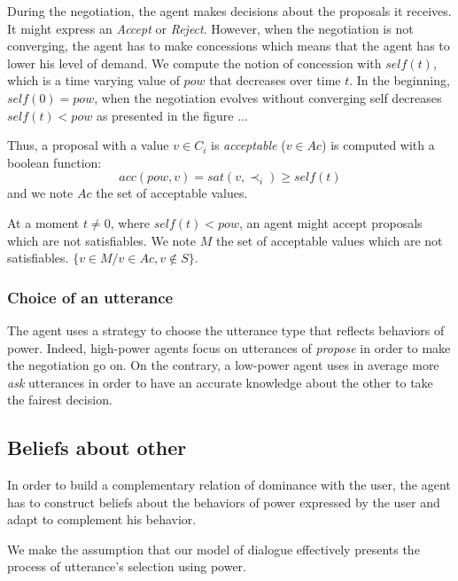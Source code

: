 \documentclass{llncs}
\begin{document}
	 During the negotiation, the agent makes decisions about the proposals it receives. It might express an \emph{Accept} or \emph{Reject}. However, when the negotiation is not converging, the agent has to make concessions which means that the agent has to lower his level of demand. 
	 We compute the notion of concession with $self(t)$, which is a time varying value of $pow$ that decreases over time $t$. In the beginning, $self(0) = pow$, when the negotiation evolves without converging self decreases $self(t) < pow$ as presented in the figure ... 
	 
	Thus, a proposal with a value $v \in C_i$ is \emph{acceptable} ($v \in Ac$) is computed with a boolean function:
			\begin{equation}
				acc(pow, v) = sat(v, \prec_i) \geq self(t)
			\end{equation}	
	and we note $Ac$ the set of acceptable values.

	At a moment $t \not = 0$, where $self(t) < pow$,  an agent might accept proposals which are not satisfiables.  We note $M$ the set of acceptable values which are not satisfiables.
	$\{v \in M / v \in Ac, v \notin S\}$.
	
%	
\subsubsection{Choice of an utterance}
	The agent uses a strategy to choose the utterance type that reflects behaviors of power. Indeed, high-power agents focus on utterances of \emph{propose} in order to make the negotiation go on. On the contrary, a low-power agent uses in average more \emph{ask} utterances in order to have an accurate knowledge about the other to take the fairest decision.
	
	\subsection{Beliefs about other}
	
	In order to build a complementary relation of dominance with the user, the agent has to construct beliefs about the behaviors of power expressed by the user and adapt to complement his behavior. 
	
	We make the assumption that our model of dialogue effectively presents the process of utterance's selection using power. 
	
\end{document}
